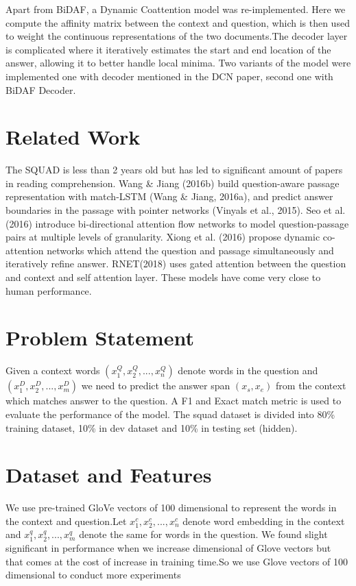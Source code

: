 \documentclass{article} %
\begin{document}
Apart from BiDAF, a Dynamic Coattention model  was re-implemented. Here we compute the affinity matrix between the context and question, which is then used to weight the continuous representations of the two documents.The decoder layer is complicated where it iteratively  estimates the start and end location of the answer, allowing it to better handle local minima. Two variants of the model were implemented one with decoder mentioned in the DCN paper, second one with BiDAF Decoder.


\section{Related Work}
The SQUAD is less than 2 years old but has led to significant amount of papers in reading comprehension. Wang \& Jiang (2016b) build question-aware passage representation with match-LSTM (Wang \& Jiang, 2016a), and predict
answer boundaries in the passage with pointer networks (Vinyals et al., 2015).  Seo et al. (2016) introduce bi-directional attention flow networks to model question-passage pairs at multiple levels of granularity. Xiong et al. (2016) propose dynamic co-attention networks which attend the question and passage simultaneously and iteratively refine answer. RNET(2018) uses gated attention between the question and context and self attention layer. These models have come very close to human performance. 

\section{Problem Statement}

Given a context words $( x^{Q}_{1} , x^{Q}_{2} , . . . , x^{Q}_{n} )$ denote words in the question and  $(x^{D}_{1} , x^{D}_{2} , . . . , x^{D}_{m} )$ we need to predict the answer span $(x_{s}, x_{e})$ from the context which matches answer to the question. A F1 and Exact match metric is used to evaluate the performance of the model. The squad dataset is divided into 80\%  training dataset, 10\% in dev dataset and 10\% in testing set (hidden).

\section{Dataset and Features}


We use pre-trained GloVe vectors  of 100 dimensional to represent the words in the context and question.Let \( x^{c}_{1} , x^{c}_{2} , . . . , x^{c}_{n} \)  denote word embedding in the context and \(x^{q}_{1} , x^{q}_{2} , . . . , x^{q}_{m} \) denote the same for words in the question. 
We found slight significant in performance when we increase dimensional of Glove vectors but that comes at the cost of increase in training time.So we use Glove vectors of 100 dimensional to conduct more experiments 
\end{document}
